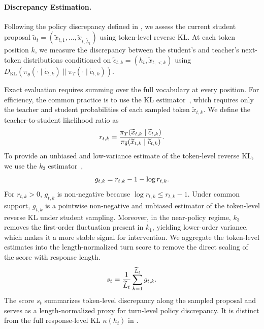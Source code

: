 \paragraph{Discrepancy Estimation.}
Following the policy discrepancy defined in , we assess the current student proposal $\widetilde{a}_t=(\widetilde{x}_{t,1},\ldots,\widetilde{x}_{t,\widetilde{L}_t})$ using token-level reverse KL.
At each token position $k$, we measure the discrepancy between the student's and teacher's next-token distributions conditioned on $\widetilde{c}_{t,k}=(h_t,\widetilde{x}_{t,<k})$ using
$D_{\mathrm{KL}}(\pi_{\bar\theta}(\cdot\mid\widetilde{c}_{t,k})\|\pi_T(\cdot\mid\widetilde{c}_{t,k}))$. 

Exact evaluation requires summing over the full vocabulary at every position.
For efficiency, the common practice is to use the KL estimator~\citep{Schulman2020KL}, which requires only the teacher and student probabilities of each sampled token $\widetilde{x}_{t,k}$.
We define the teacher-to-student likelihood ratio as
\begin{equation}
    \setlength\abovedisplayskip{1.3pt}
    \setlength\belowdisplayskip{1.3pt}
    r_{t,k}
    =
    \frac{\pi_T(\widetilde{x}_{t,k}\mid\widetilde{c}_{t,k})}
         {\pi_{\bar\theta}(\widetilde{x}_{t,k}\mid\widetilde{c}_{t,k})}.
    \label{eq:teacher_student_ratio}
\end{equation} 
To provide an unbiased and low-variance estimate of the token-level reverse KL, we use the $k_3$ estimator~\citep{Schulman2020KL},
\begin{equation}
    \setlength\abovedisplayskip{1.3pt}
    \setlength\belowdisplayskip{1.3pt}
    g_{t,k}=r_{t,k}-1-\log r_{t,k}.
    \label{eq:k3_estimator}
\end{equation}
For $r_{t,k}>0$, $g_{t,k}$ is non-negative because $\log r_{t,k}\leq r_{t,k}-1$. 
Under common support, $g_{t,k}$ is a pointwise non-negative and unbiased
estimator of the token-level reverse KL under student sampling.
Moreover, in the near-policy regime, $k_3$ removes the first-order fluctuation present in $k_1$, yielding lower-order variance, which makes it a more stable signal for intervention.
We aggregate the token-level estimates into the length-normalized turn score to remove the direct scaling of the score with response length.
\begin{equation}
    \setlength\abovedisplayskip{1.3pt}
    \setlength\belowdisplayskip{1.3pt}
    s_t
    =
    \frac{1}{\widetilde{L}_t}
    \sum_{k=1}^{\widetilde{L}_t}g_{t,k}.
    \label{eq:normalized_turn_score}
\end{equation}
The score $s_t$ summarizes token-level discrepancy along the sampled proposal and serves as a length-normalized proxy for turn-level policy discrepancy.
It is distinct from the full response-level KL $\kappa(h_t)$ in .


